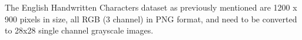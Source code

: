 
The English Handwritten Characters dataset as previously mentioned are 1200 x 900 pixels in size, all RGB (3 channel) in PNG format, and need to be converted to 28x28 single channel grayscale images.


